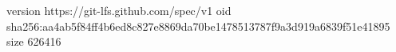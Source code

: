 version https://git-lfs.github.com/spec/v1
oid sha256:aa4ab5f84ff4b6ed8c827e8869da70be1478513787f9a3d919a6839f51e41895
size 626416
